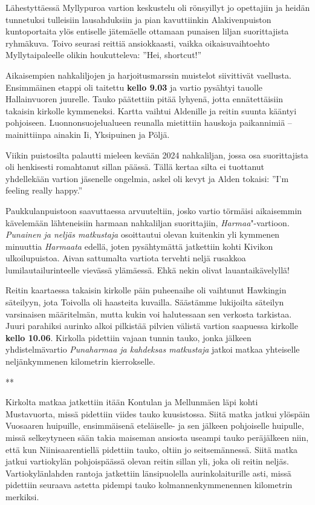 \begin{multicols}{2}
Lähestyttäessä Myllypuroa vartion keskustelu oli rönsyillyt jo opettajiin 
ja heidän tunnetuksi tulleisiin lausahduksiin ja pian kavuttiinkin 
Alakivenpuiston kuntoportaita ylös entiselle jätemäelle ottamaan punaisen 
liljan suorittajista ryhmäkuva. Toivo seurasi reittiä ansiokkaasti, vaikka 
oikaisuvaihtoehto Myllytaipaleelle olikin houkutteleva: ''Hei, shortcut!''

Aikaisempien nahkaliljojen ja harjoitusmarssin muistelot siivittivät 
vaellusta. Ensimmäinen etappi oli taitettu \textbf{kello 9.03} ja vartio 
pysähtyi tauolle Hallainvuoren juurelle. Tauko päätettiin pitää lyhyenä, 
jotta ennätettäisiin takaisin kirkolle kymmeneksi. Kartta vaihtui Aldenille 
ja reitin suunta kääntyi pohjoiseen. Luonnonsuojelualueen reunalla mietittiin 
hauskoja paikannimiä -- mainittiinpa ainakin Ii, Yksipuinen ja Pöljä. 

Viikin puistosilta palautti mieleen kevään 2024 nahkaliljan, jossa osa 
suorittajista oli henkisesti romahtanut sillan päässä. Tällä kertaa silta 
ei tuottanut yhdellekään vartion jäsenelle ongelmia, askel oli kevyt ja 
Alden tokaisi: ''I'm feeling really happy.''

Paukkulanpuistoon saavuttaessa arvuuteltiin, josko vartio törmäisi 
aikaisemmin kävelemään lähteneisiin harmaan nahkaliljan suorittajiin, 
\textit{Harmaa}"-vartioon. \textit{Punainen ja neljäs matkustaja} osoittautui 
olevan kuitenkin yli kymmenen minuuttia \textit{Harmaata} edellä, joten 
pysähtymättä jatkettiin kohti Kivikon ulkoilupuistoa. Aivan sattumalta 
vartiota tervehti neljä rusakkoa lumilautailurinteelle vievässä 
ylämäessä. Ehkä nekin olivat lauantaikävelyllä!

Reitin kaartaessa takaisin kirkolle päin puheenaihe oli vaihtunut Hawkingin 
säteilyyn, jota Toivolla oli haasteita kuvailla. Säästämme lukijoilta 
säteilyn varsinaisen määritelmän, mutta kukin voi halutessaan sen verkosta 
tarkistaa. Juuri parahiksi aurinko alkoi pilkistää pilvien välistä vartion 
saapuessa kirkolle \textbf{kello 10.06}. Kirkolla pidettiin vajaan tunnin 
tauko, jonka jälkeen yhdistelmävartio \textit{Punaharmaa ja kahdeksas 
matkustaja} jatkoi matkaa yhteiselle neljänkymmenen kilometrin kierrokselle. 

{\smallskip\noindent\centering ***\par\smallskip}

Kirkolta matkaa jatkettiin itään Kontulan ja Mellunmäen läpi kohti Mustavuorta, missä pidettiin viides tauko kuusistossa. Siitä matka jatkui ylöspäin Vuosaaren huipuille, ensimmäisenä eteläiselle- ja sen jälkeen pohjoiselle huipulle, missä selkeytyneen sään takia maiseman ansiosta useampi tauko peräjälkeen niin, että kun Niinisaarentiellä pidettiin tauko, oltiin jo seitsemännessä. Siitä matka jatkui vartiokylän pohjoispäässä olevan reitin sillan yli, joka oli reitin neljäs. Vartiokylänlahden rantoja jatkettiin länsipuolella aurinkolaiturille asti, missä pidettiin seuraava astetta pidempi tauko kolmannenkymmenennen kilometrin merkiksi.


\end{multicols}
